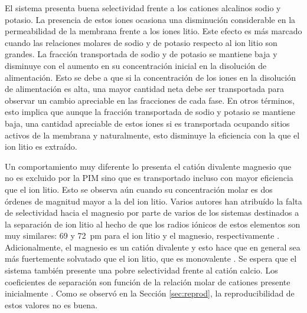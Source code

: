 \clearpage El sistema presenta buena selectividad frente a los cationes alcalinos sodio y potasio. La presencia de estos iones ocasiona una disminución considerable en la permeabilidad de la membrana frente a los iones litio. Este efecto es más marcado cuando las relaciones molares de sodio y de potasio respecto al ion litio son grandes. La fracción transportada de sodio y de potasio se mantiene baja y disminuye con el aumento en su concentración inicial en la disolución de alimentación. Esto se debe a que si la concentración de los iones en la disolución de alimentación es alta, una mayor cantidad neta debe ser transportada para observar un cambio apreciable en las fracciones de cada fase. En otros términos, esto implica que aunque la fracción transportada de sodio y potasio se mantiene baja, una cantidad apreciable de estos iones si es transportada ocupando sitios activos de la membrana y naturalmente, esto disminuye la eficiencia con la que el ion litio es extraído.

Un comportamiento muy diferente lo presenta el catión divalente magnesio que no es excluido por la PIM sino que es transportado incluso con mayor eficiencia que el ion litio. Esto se observa aún cuando su concentración molar es dos órdenes de magnitud mayor a la del ion litio. Varios autores \citep{Liu2020, Zhang2019} han atribuído la falta de selectividad hacia el magnesio por parte de varios de los sistemas destinados a la separación de ion litio al hecho de que los radios iónicos de estos elementos son muy similares: 69 y 72~pm para el ion litio y el magnesio, respectivamente \citep{Marcus1994}. Adicionalmente, el magnesio es un catión divalente y esto hace que en general sea más fuertemente solvatado que el ion litio, que es monovalente \citep{Israelachvili2011}. Se espera que el sistema también presente una pobre selectividad frente al catión calcio.  Los coeficientes de separación son función de la relación molar de cationes presente inicialmente \citep{Chen2018}. Como se observó en la Sección \ref{sec:reprod}, la reproducibilidad de estos valores no es buena.

